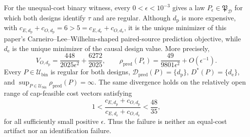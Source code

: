For the unequal-cost binary witness, every \(0<\epsilon<10^{-3}\) gives a law \(P_\epsilon\in\mathfrak P_{\mathcal D}\) for which both designs identify \(\tau\) and are regular. Although \(d_{\mathrm p}\) is more expensive, with \(c_{E,d_{\mathrm p}}+c_{O,d_{\mathrm p}}=6>5=c_{E,d_{\mathrm e}}+c_{O,d_{\mathrm e}}\), it is the unique minimizer of this paper's Carneiro--Lee--Wilhelm-shaped paired-source prediction objective, while \(d_{\mathrm e}\) is the unique minimizer of the causal design value. More precisely,
\[
 V_{O,d_{\mathrm p}}=\frac{448}{2025\epsilon^2}+\frac{6272}{2025},\qquad
 \rho_{\mathrm{pred}}(P_\epsilon)=\frac{49}{9801\epsilon^2}+O(\epsilon^{-1}).
\]
Every \(P\in\mathcal U_{\mathrm{bin}}\) is regular for both designs, \(\mathcal D_{\mathrm{pred}}(P)=\{d_{\mathrm p}\}\), \(D^*(P)=\{d_{\mathrm e}\}\), and \(\sup_{P\in\mathcal U_{\mathrm{bin}}}\rho_{\mathrm{pred}}(P)=\infty\). The same divergence holds on the relatively open range of cap-feasible cost vectors satisfying
\[
 1<\frac{c_{E,d_{\mathrm p}}+c_{O,d_{\mathrm p}}}
 {c_{E,d_{\mathrm e}}+c_{O,d_{\mathrm e}}}<\frac{48}{35},
\]
for all sufficiently small positive \(\epsilon\). Thus the failure is neither an equal-cost artifact nor an identification failure.